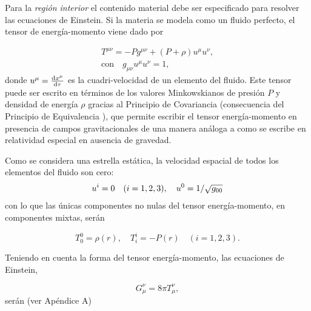 Para la \textit{región interior} el contenido material debe ser especificado para resolver las ecuaciones de Einstein. Si la materia se modela como un fluido perfecto, el tensor de energía-momento viene dado por

\begin{equation}\label{EMT}
    \begin{array} { c } { T ^ { \mu \nu } = - P g ^ { \mu \nu } + ( P + \rho ) u ^ { \mu } u ^ { \nu } }, \\ \text{con} \quad { g _ { \mu \nu } u ^ { \mu } u ^ { \nu } = 1 }, \end{array}
\end{equation}
donde $u^{\mu}=\dv{x^{\mu}}{\tau}$ es la cuadri-velocidad de un elemento del fluido. Este tensor puede ser escrito en términos de los valores Minkowskianos de presión $P$ y densidad de energía $\rho$ gracias al Principio de Covariancia (consecuencia del Principio de Equivalencia \cite{Weinberg1972}), que permite escribir el tensor energía-momento en presencia de campos gravitacionales de una manera análoga a como se escribe en relatividad especial en ausencia de gravedad.

Como se considera una estrella estática, la velocidad espacial de todos los elementos del fluido son cero:
\begin{equation}
    u^{i}=0 \quad (i=1,2,3)\qc u ^ { 0 } = 1 / \sqrt { g _ { 00 } }
\end{equation}
con lo que las únicas componentes no nulas del tensor energía-momento, en componentes mixtas, serán

\begin{equation}
T _ { 0 } ^ { 0 } = \rho(r) , \quad T _ { i } ^ { i } = - P(r) \quad ( i=1,2,3 ).  
\end{equation}

Teniendo en cuenta la forma del tensor energía-momento, las ecuaciones de Einstein,

\begin{equation}
    G _ { \mu } ^ { \nu } = 8 \pi T _ { \mu } ^ { \nu },
\end{equation}
serán (ver Apéndice A)

